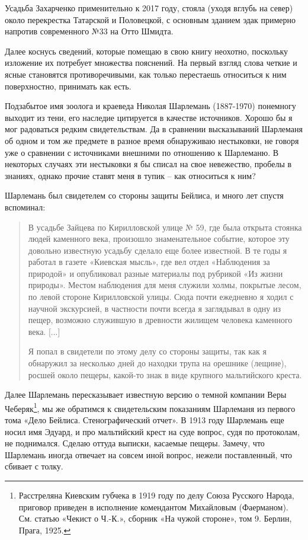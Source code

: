 Усадьба Захарченко применительно к 2017 году, стояла (уходя вглубь на север) около перекрестка Татарской и Половецкой, с основным зданием эдак примерно напротив современного №33 на Отто Шмидта.

Далее коснусь сведений, которые помещаю в свою книгу неохотно, поскольку изложение их потребует множества пояснений. На первый взгляд слова четкие и ясные становятся противоречивыми, как только перестаешь относиться к ним поверхностно, принимать как есть.

Подзабытое имя зоолога и краеведа Николая Шарлемань (1887-1970) понемногу выходит из тени, его наследие цитируется в качестве источников. Хорошо бы я мог радоваться редким свидетельствам. Да в сравнении высказываний Шарлеманя об одном и том же предмете в разное время обнаруживаю нестыковки, не говоря уже о сравнении с источниками внешними по отношению к Шарлеманю. В некоторых случаях эти нестыковки я бы списал на свое невежество, пробелы в знаниях, однако прочие ставят меня в тупик – как относиться к ним?

Шарлемань был свидетелем со стороны защиты Бейлиса, и много лет спустя вспоминал\cite{sharl01}:

\begin{quotation}
В усадьбе Зайцева по Кирилловской улице № 59, где была открыта стоянка людей каменного века, произошло знаменательное событие, которое эту довольно известную усадьбу сделало еще более известной. В те годы я работал в газете «Киевская мысль», где вел отдел «Наблюдения за природой» и опубликовал разные материалы под рубрикой «Из жизни природы». Местом наблюдения для меня служили холмы, покрытые лесом, по левой стороне Кирилловской улицы. Сюда почти ежедневно я ходил с научной экскурсией, в частности почти всегда я заглядывал в одну из пещер, возможно служившую в древности жилищем человека каменного века. [...]

Я попал в свидетели по этому делу со стороны защиты, так как я обнаружил за несколько дней до находки трупа на орешнике (лещине), росшей около пещеры, какой-то знак в виде крупного мальтийского креста.
\end{quotation}

Далее Шарлемань пересказывает известную версию о темной компании Веры Чеберяк\footnote{Расстреляна Киевским губчека в 1919 году по делу Союза Русского Народа, приговор приведен в исполнение комендантом Михайловым (Фаерманом). См. статью «Чекист о Ч.-К.», сборник «На чужой стороне», том 9. Берлин, Прага, 1925.}, мы же обратимся к свидетельским показаниям Шарлеманя из первого тома «Дело Бейлиса. Стенографический отчет». В 1913 году Шарлемань еще носил имя Эдуард, и про мальтийский крест на суде вопрос, судя по протоколам, не поднимался. Сделаю оттуда выписки, касаемые пещеры. Замечу, что Шарлемань иногда отвечает на совсем иной вопрос, нежели поставленный, что сбивает с толку.

